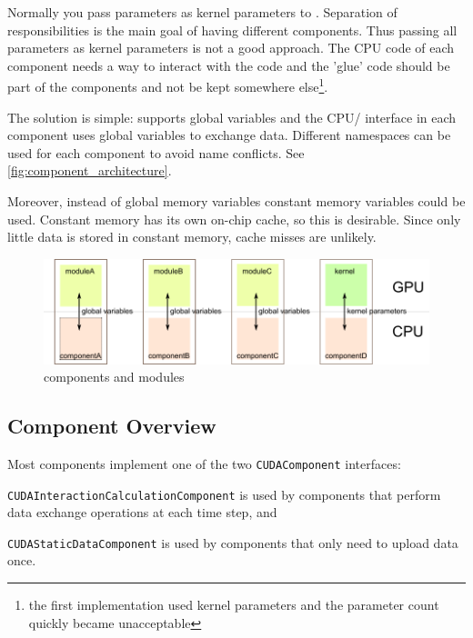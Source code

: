 Normally you pass parameters as kernel parameters to \cuda{}. Separation of responsibilities is the main goal of having different components. Thus passing all parameters as kernel parameters is not a good approach. The CPU code of each component needs a way to interact with the \cuda{} code and the 'glue' code should be part of the components and not be kept somewhere else\footnote{the first implementation used kernel parameters and the parameter count quickly became unacceptable}.

The solution is simple: \cuda{} supports global variables and the CPU/\cuda{} interface in each component uses global variables to exchange data. Different namespaces can be used for each component to avoid name conflicts. See \autoref{fig:component_architecture}.

Moreover, instead of global memory variables constant memory variables could be used. Constant memory has its own on-chip cache, so this is desirable. Since only little data is stored in constant memory, cache misses are unlikely.

\begin{figure}
\includegraphics{figures/component_architecture.pdf}
\caption{components and \cuda{} modules}
\label{fig:component_architecture}
\end{figure}

\subsection{Component Overview}
Most components implement one of the two \lstinline!CUDAComponent! interfaces:
\begin{compactitem}
\item \lstinline!CUDAInteractionCalculationComponent! is used by components that perform data exchange operations at each time step, and
\item \lstinline!CUDAStaticDataComponent! is used by components that only need to upload data once.
\end{compactitem}

